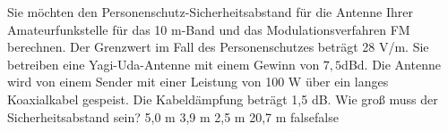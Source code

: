     {Sie möchten den Personenschutz-Sicherheitsabstand für die Antenne Ihrer Amateurfunkstelle für das 10 m-Band und das Modulationsverfahren FM berechnen. Der Grenzwert im Fall des Personenschutzes beträgt 28 V/m. Sie betreiben eine Yagi-Uda-Antenne mit einem Gewinn von $7,5 $dBd. Die Antenne wird von einem Sender mit einer Leistung von 100 W über ein langes Koaxialkabel gespeist. Die Kabeldämpfung beträgt 1,5 dB. Wie groß muss der Sicherheitsabstand sein?}
    {5,0 m}
    {3,9 m}
    {2,5 m}
    {20,7 m}
    {false}{false}